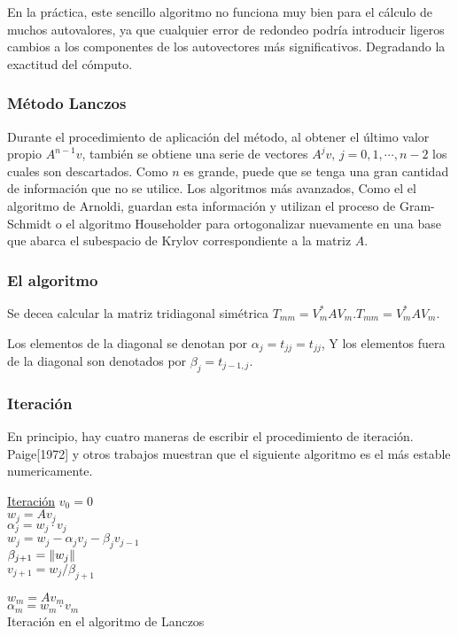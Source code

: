 \documentclass[a4paper,openright,12pt, oneside]{book}
\DeclarePairedDelimiter\norm{\lVert}{\rVert}
\begin{document}
En la pr\'actica, este sencillo algoritmo no funciona muy bien para el c\'alculo de muchos autovalores, ya que cualquier error de redondeo podr\'ia introducir ligeros cambios a los componentes de los autovectores m\'as significativos. Degradando la exactitud del c\'omputo.

\subsubsection{M\'etodo Lanczos}
Durante el procedimiento de aplicaci\'on del m\'etodo, al obtener el \'ultimo valor propio ${\displaystyle A^{n-1}v}$, tambi\'en se obtiene una serie de vectores ${\displaystyle A^{j}v,\,j=0,1,\cdots ,n-2}$ los cuales son descartados. Como ${\displaystyle n}$ es grande, puede que se tenga una gran cantidad de informaci\'on que no se utilice. Los algoritmos m\'as avanzados, Como el el algoritmo de Arnoldi, guardan esta informaci\'on y utilizan el proceso de Gram-Schmidt o el algoritmo Householder para ortogonalizar nuevamente en una base que abarca el subespacio de Krylov correspondiente a la matriz ${\displaystyle A}$.

\subsubsection{El algoritmo}

Se decea calcular la matriz tridiagonal sim\'etrica ${\displaystyle T_{mm}=V_{m}^{*}AV_{m}.} {\displaystyle T_{mm}=V_{m}^{*}AV_{m}.}$

Los elementos de la diagonal se denotan por ${\displaystyle \alpha _{j}=t_{jj}=t_{jj} }$, Y los elementos fuera de la diagonal son denotados por ${\displaystyle \beta _{j}=t_{j-1,j}}$.

\subsubsection{Iteraci\'on}

En principio, hay cuatro maneras de escribir el procedimiento de iteraci\'on.
Paige[1972] y otros trabajos muestran que el siguiente algoritmo es el m\'as estable numericamente. \cite{Cullum} \cite{booksaad}


\begin{algorithm}
    \underline{Iteraci\'on}\;
    ${v_{0}} = 0$\\

    {
      $w_j = Av_j$ \\
      $\alpha_j = w_j \cdot v_j $\\
      $w_j = w_j - \alpha_j v_j - \beta_j v_{j-1}$ \\
      $\beta_{j+1} = \norm{w_j}$ \\
      $v_{j+1} = w_j / \beta_{j+1}$\\ 
    }

    $w_m = Av_m$ \\
    $\alpha_m = w_m \cdot v_m $\\
    \caption{Iteraci\'on en el algoritmo de Lanczos}

\end{algorithm}
\end{document}
